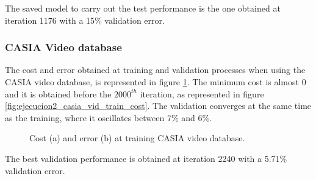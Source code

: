 The saved model to carry out the test performance is the one obtained at iteration 1176 with a 15\% validation error.

\subsubsection{CASIA Video database}
The cost and error obtained at training and validation processes when using the CASIA video database, is represented in figure \ref{fig:ejecucion2_casia_vid_train}. The minimum cost is almost 0 and it is obtained before the $2000^{th}$ iteration, as represented in figure \ref{fig:ejecucion2_casia_vid_train_cost}. The validation converges at the same time as the training, where it oscillates between 7\% and 6\%.\\
\begin{figure}[htb]
\centering
\caption{Cost (a) and error (b) at training CASIA video database.}
\label{fig:ejecucion2_casia_vid_train}
\end{figure}

The best validation performance is obtained at iteration 2240 with a 5.71\% validation error.

